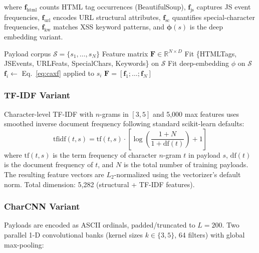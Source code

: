 \documentclass[conference]{IEEEtran}
\begin{document}
where $\mathbf{f}_{\text{html}}$ counts HTML tag occurrences (BeautifulSoup),
$\mathbf{f}_{\text{js}}$ captures JS event frequencies,
$\mathbf{f}_{\text{url}}$ encodes URL structural attributes,
$\mathbf{f}_{\text{sc}}$ quantifies special-character frequencies,
$\mathbf{f}_{\text{kw}}$ matches XSS keyword patterns, and
$\boldsymbol{\phi}(s)$ is the deep embedding variant.

\begin{algorithm}[t]
\caption{CAXF Feature Extraction}
\label{alg:caxf}
\begin{algorithmic}[1]
\REQUIRE Payload corpus $\mathcal{S} = \{s_1, \ldots, s_N\}$
\ENSURE Feature matrix $\mathbf{F} \in \mathbb{R}^{N \times D}$
\STATE Fit \{HTMLTags, JSEvents, URLFeats, SpecialChars, Keywords\} on $\mathcal{S}$
\STATE Fit deep-embedding $\phi$ on $\mathcal{S}$
  \STATE $\mathbf{f}_i \leftarrow$ Eq.~\ref{eq:caxf} applied to $s_i$
\ENDFOR
\RETURN $\mathbf{F} = [\mathbf{f}_1; \ldots; \mathbf{f}_N]$
\end{algorithmic}
\end{algorithm}

\subsubsection{TF-IDF Variant}

Character-level TF-IDF with $n$-grams in $[3,5]$ and 5,000 max features uses smoothed inverse document frequency following standard scikit-learn defaults:
\begin{equation}
  \text{tfidf}(t,s) = \text{tf}(t,s) \cdot \left[ \log\left( \frac{1+N}{1+\text{df}(t)} \right) + 1 \right]
  \label{eq:tfidf}
\end{equation}
where $\text{tf}(t,s)$ is the term frequency of character $n$-gram $t$ in payload $s$, $\text{df}(t)$ is the document frequency of $t$, and $N$ is the total number of training payloads. The resulting feature vectors are $L_2$-normalized using the vectorizer's default norm.
Total dimension: 5,282 (structural + TF-IDF features).

\subsubsection{CharCNN Variant}

Payloads are encoded as ASCII ordinals, padded/truncated to $L=200$.
Two parallel 1-D convolutional banks (kernel sizes $k{\in}\{3,5\}$, 64 filters)
with global max-pooling:
\end{document}
